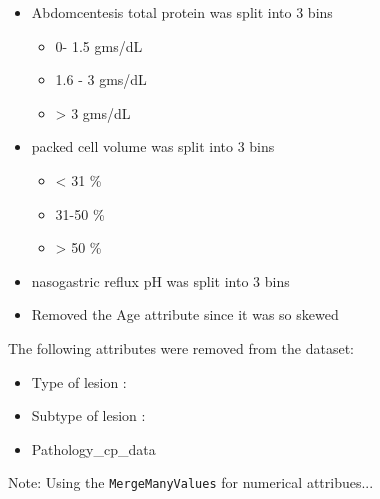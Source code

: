 \begin{itemize}
\item Abdomcentesis total protein was split into 3 bins
\begin{itemize}
\item 0- 1.5 gms/dL
\item 1.6 - 3 gms/dL
\item > 3 gms/dL
\end{itemize}

\item packed cell volume was split into 3 bins
\begin{itemize}
\item < 31 \%
\item 31-50 \%
\item > 50 \%
\end{itemize}

\item nasogastric reflux pH was split into 3 bins

\item Removed the Age attribute since it was so skewed


\end{itemize}


The following attributes were removed from the dataset:
\begin{itemize}
\item Type of lesion :
\item Subtype of lesion : 
\item Pathology_cp_data
\end{itemize}


Note: Using the \verb|MergeManyValues| for numerical attribues...